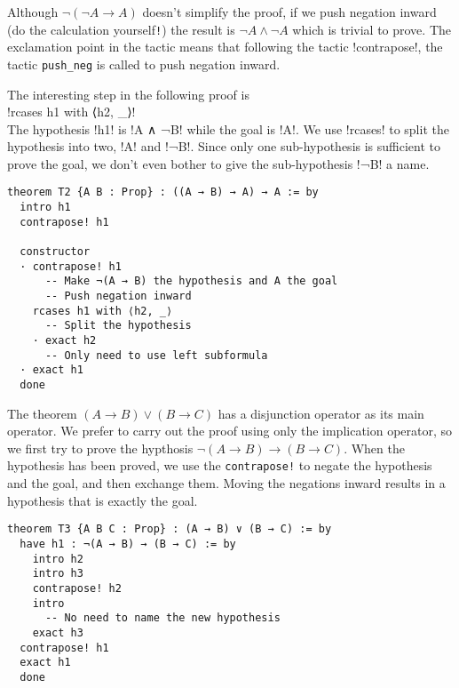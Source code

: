 Although $\neg(\neg A \rightarrow A)$ doesn't simplify the proof, if we push negation inward (do the calculation yourself\verb+!+) the result is $\neg A \wedge \neg A$ which is trivial to prove. The exclamation point in the tactic means that following the tactic !contrapose!, the tactic \Verb+push_neg+ is called to push negation inward.


The interesting step in the following proof is \\
\indnt{}!rcases h1 with ⟨h2, _⟩!\\
The hypothesis !h1! is !A ∧ ¬B! while the goal is !A!. We use !rcases! to split the hypothesis into two, !A! and !¬B!. Since only one sub-hypothesis is sufficient to prove the goal, we don't even bother to give the sub-hypothesis !¬B! a name.
\begin{Verbatim}[firstnumber=last]
theorem T2 {A B : Prop} : ((A → B) → A) → A := by
  intro h1
  contrapose! h1

  constructor
  · contrapose! h1
      -- Make ¬(A → B) the hypothesis and A the goal
      -- Push negation inward
    rcases h1 with ⟨h2, _⟩
      -- Split the hypothesis
    · exact h2
      -- Only need to use left subformula
  · exact h1
  done
\end{Verbatim}


The theorem $(A\rightarrow B) \vee (B \rightarrow C)$ has a disjunction operator as its main operator. We prefer to carry out the proof using only the implication operator, so we first try to prove the hypthosis $\neg(A\rightarrow B) \rightarrow (B \rightarrow C)$. When the hypothesis has been proved, we use the \Verb+contrapose!+ to negate the hypothesis and the goal, and then exchange them. Moving the negations inward results in a hypothesis that is exactly the goal.
\begin{Verbatim}[firstnumber=last]
theorem T3 {A B C : Prop} : (A → B) ∨ (B → C) := by
  have h1 : ¬(A → B) → (B → C) := by
    intro h2
    intro h3
    contrapose! h2
    intro
      -- No need to name the new hypothesis
    exact h3
  contrapose! h1
  exact h1
  done
\end{Verbatim}

